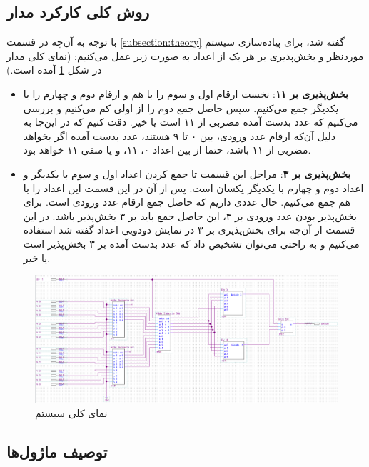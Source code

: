 \documentclass[12pt,onecolumn,a4paper,fleqn]{article}
\begin{document}
	\subsection{روش کلی کارکرد مدار}
	با توجه به آن‌چه در قسمت
	\ref{subsection:theory}
	گفته شد، برای پیاده‌سازی سیستم موردنظر و بخش‌پذیری بر هر یک از اعداد به صورت زیر عمل می‌کنیم: (نمای کلی مدار در شکل
	\ref{topModule}
	آمده است.)
	\begin{itemize}
		\item \textbf{بخش‌پذیری بر ۱۱}:
		نخست ارقام اول و سوم را با هم و ارقام دوم و چهارم را با یکدیگر جمع می‌کنیم. سپس حاصل جمع دوم را از اولی کم می‌کنیم و بررسی می‌کنیم که عدد بدست آمده مضربی از ۱۱ است یا خیر. دقت کنیم که در این‌جا به دلیل آن‌که ارقام عدد ورودی، بین ۰ تا ۹ هستند، عدد بدست آمده اگر بخواهد مضربی از ۱۱ باشد، حتما از بین اعداد ۰، ۱۱، و یا منفی ۱۱ خواهد بود.
		\item \textbf{بخش‌پذیری بر ۳}:
		مراحل این قسمت تا جمع کردن اعداد اول و سوم با یکدیگر و اعداد دوم و چهارم با یکدیگر یکسان است. پس از آن در این قسمت این اعداد را با هم جمع می‌کنیم. حال عددی داریم که حاصل جمع ارقام عدد ورودی‌ است. برای بخش‌پذیر بودن عدد ورودی بر ۳، این حاصل جمع باید بر ۳ بخش‌پذیر باشد. در این قسمت از آن‌چه برای بخش‌پذیری بر ۳ در نمایش دودویی اعداد گفته شد استفاده می‌کنیم و به راحتی می‌توان تشخیص داد که عدد بدست آمده بر ۳ بخش‌پذیر است یا خیر.
	\end{itemize} 
	\begin{figure}[H]
		\centering
		\includegraphics[scale=0.4]{source/top_module.png}
		\caption{نمای کلی سیستم}
		\label{topModule}
	\end{figure}
	
	\subsection{توصیف ماژول‌ها}
\end{document}
